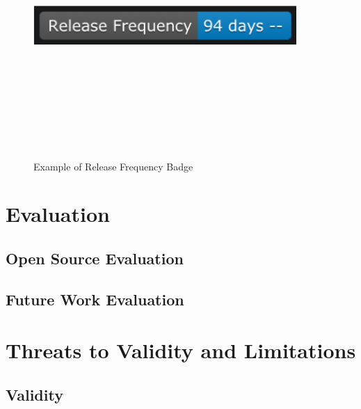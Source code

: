 \documentclass[12pt, letterpaper]{article}
\begin{document}
\begin{figure}[!htb]
    \centerline{
        \includegraphics[width=10cm,height=10cm,keepaspectratio=true]{releasebadge}
    }
    \caption{
        Example of Release Frequency Badge
    }
    \label{releasebadge}
\end{figure}




\section{Evaluation}

\subsection{Open Source Evaluation}
\subsection{Future Work Evaluation}

\section{Threats to Validity and Limitations}
\subsection{Validity}
\end{document}
